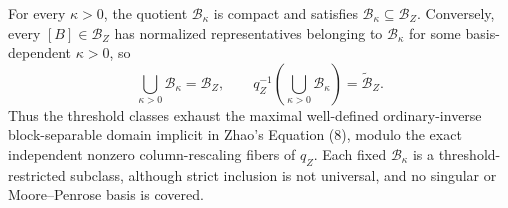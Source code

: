 For every \(\kappa>0\), the quotient \(\mathcal B_\kappa\) is compact and satisfies \(\mathcal B_\kappa\subseteq\mathcal B_Z\).  Conversely, every \([B]\in\mathcal B_Z\) has normalized representatives belonging to \(\mathcal B_\kappa\) for some basis-dependent \(\kappa>0\), so
\[
\bigcup_{\kappa>0}\mathcal B_\kappa=\mathcal B_Z,
\qquad
q_Z^{-1}\!\left(\bigcup_{\kappa>0}\mathcal B_\kappa\right)=\widetilde{\mathcal B}_Z.
\]
Thus the threshold classes exhaust the maximal well-defined ordinary-inverse block-separable domain implicit in Zhao's Equation (8), modulo the exact independent nonzero column-rescaling fibers of \(q_Z\).  Each fixed \(\mathcal B_\kappa\) is a threshold-restricted subclass, although strict inclusion is not universal, and no singular or Moore--Penrose basis is covered.